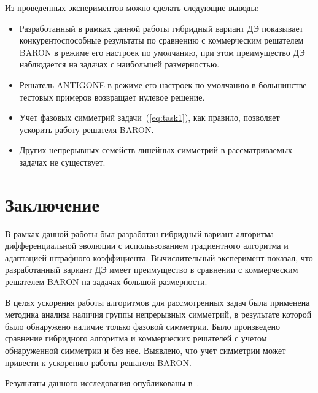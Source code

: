 Из проведенных экспериментов можно сделать следующие выводы:
\begin{itemize}
  \item Разработанный в рамках данной работы гибридный вариант ДЭ показывает конкурентоспособные результаты по сравнению с коммерческим решателем BARON в режиме его настроек по умолчанию, при этом преимущество ДЭ наблюдается на задачах с наибольшей размерностью.
  \item Решатель ANTIGONE в режиме его настроек по умолчанию в большинстве тестовых примеров возвращает нулевое решение.
  \item Учет фазовых симметрий задачи~(\ref{eq:task1}), как правило, позволяет ускорить работу решателя BARON.
  \item Других непрерывных семейств линейных симметрий в рассматриваемых задачах не существует.
\end{itemize}

\section{Заключение}\label{sec:conclusion}

В рамках данной работы был разработан гибридный вариант алгоритма дифференциальной эволюции с исполььзованием градиентного алгоритма и адаптацией штрафного коэффициента. Вычислительный эксперимент показал, что разработанный вариант ДЭ имеет преимущество в сравнении с коммерческим решателем BARON на задачах большой размерности.

В целях ускорения работы алгоритмов для рассмотренных задач была применена методика анализа наличия группы непрерывных симметрий, в результате которой было обнаружено наличие только фазовой симметрии. Было произведено сравнение гибридного алгоритма и коммерческих решателей с учетом обнаруженной симметрии и без нее. Выявлено, что учет симметрии может привести к ускорению работы решателя BARON.

Результаты данного исследования опубликованы в~\cite{tyu:de_sym}.
